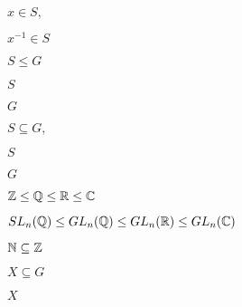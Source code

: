 \documentclass[10pt]{book}
\begin{document}
\begin{mdSnippets}
\begin{mdInlineSnippet}[b961b843c185409afbf9479d5887768d]%
$x \in S,$\end{mdInlineSnippet}%
\begin{mdInlineSnippet}[491916ce3ac28e83dd1dfc4d61313f28]%
$x^{-1} \in S$\end{mdInlineSnippet}%
\begin{mdInlineSnippet}%
$S \le G$\end{mdInlineSnippet}%
\begin{mdInlineSnippet}%
$S$\end{mdInlineSnippet}%
\begin{mdInlineSnippet}[dfcf28d0734569a6a693bc8194de62bf]%
$G$\end{mdInlineSnippet}%
\begin{mdInlineSnippet}[8566bd272041c7d1c0df4b2a5d8ce542]%
$S \subseteq G,$\end{mdInlineSnippet}%
\begin{mdInlineSnippet}%
$S$\end{mdInlineSnippet}%
\begin{mdInlineSnippet}[dfcf28d0734569a6a693bc8194de62bf]%
$G$\end{mdInlineSnippet}%
\begin{mdInlineSnippet}%
$\mathbb{Z} \le \mathbb{Q} \le \mathbb{R} \le \mathbb{C}$\end{mdInlineSnippet}%
\begin{mdInlineSnippet}[1d79408fd14b38fac17c33ac78d964a8]%
$SL_n(\mathbb{Q}) \le GL_n(\mathbb{Q}) \le GL_n(\mathbb{R}) \le GL_n(\mathbb{C})$\end{mdInlineSnippet}%
\begin{mdInlineSnippet}[962ed5fcdc311970f6634c9cd85f4768]%
$\mathbb{N} \subseteq \mathbb{Z}$\end{mdInlineSnippet}%
\begin{mdInlineSnippet}%
$X \subseteq G$\end{mdInlineSnippet}%
\begin{mdInlineSnippet}[02129bb861061d1a052c592e2dc6b383]%
$X$\end{mdInlineSnippet}%

\end{mdSnippets}
\end{document}
